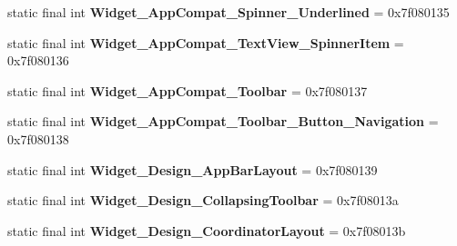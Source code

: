 \begin{DoxyCompactItemize}
\item 
\hypertarget{classandroid_1_1support_1_1design_1_1_r_1_1style_acef1f548c2829a2ec8d901c69e71a2e8}{}static final int {\bfseries Widget\+\_\+\+App\+Compat\+\_\+\+Spinner\+\_\+\+Underlined} = 0x7f080135\label{classandroid_1_1support_1_1design_1_1_r_1_1style_acef1f548c2829a2ec8d901c69e71a2e8}

\item 
\hypertarget{classandroid_1_1support_1_1design_1_1_r_1_1style_a312f7d2acedfe37ba69323b72be9ac8f}{}static final int {\bfseries Widget\+\_\+\+App\+Compat\+\_\+\+Text\+View\+\_\+\+Spinner\+Item} = 0x7f080136\label{classandroid_1_1support_1_1design_1_1_r_1_1style_a312f7d2acedfe37ba69323b72be9ac8f}

\item 
\hypertarget{classandroid_1_1support_1_1design_1_1_r_1_1style_acf5c2e90e5ec401cf8befb6708bdfe1b}{}static final int {\bfseries Widget\+\_\+\+App\+Compat\+\_\+\+Toolbar} = 0x7f080137\label{classandroid_1_1support_1_1design_1_1_r_1_1style_acf5c2e90e5ec401cf8befb6708bdfe1b}

\item 
\hypertarget{classandroid_1_1support_1_1design_1_1_r_1_1style_a6f721ee1613805b7fdb270545f575576}{}static final int {\bfseries Widget\+\_\+\+App\+Compat\+\_\+\+Toolbar\+\_\+\+Button\+\_\+\+Navigation} = 0x7f080138\label{classandroid_1_1support_1_1design_1_1_r_1_1style_a6f721ee1613805b7fdb270545f575576}

\item 
\hypertarget{classandroid_1_1support_1_1design_1_1_r_1_1style_ac05746c2babe4cc3601d558ffdf6806d}{}static final int {\bfseries Widget\+\_\+\+Design\+\_\+\+App\+Bar\+Layout} = 0x7f080139\label{classandroid_1_1support_1_1design_1_1_r_1_1style_ac05746c2babe4cc3601d558ffdf6806d}

\item 
\hypertarget{classandroid_1_1support_1_1design_1_1_r_1_1style_ad5b861aa8579d0792ab299950a7e5203}{}static final int {\bfseries Widget\+\_\+\+Design\+\_\+\+Collapsing\+Toolbar} = 0x7f08013a\label{classandroid_1_1support_1_1design_1_1_r_1_1style_ad5b861aa8579d0792ab299950a7e5203}

\item 
\hypertarget{classandroid_1_1support_1_1design_1_1_r_1_1style_a29eed8aef81e32c9973e6dfcacb41857}{}static final int {\bfseries Widget\+\_\+\+Design\+\_\+\+Coordinator\+Layout} = 0x7f08013b\label{classandroid_1_1support_1_1design_1_1_r_1_1style_a29eed8aef81e32c9973e6dfcacb41857}


\end{DoxyCompactItemize}
